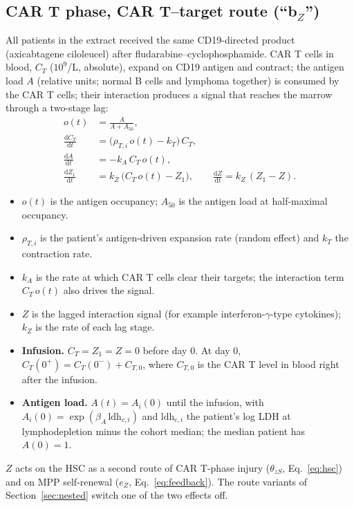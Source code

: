 \documentclass[11pt]{article}
\newcommand{\dd}{\mathrm{d}}
\begin{document}
\subsection{CAR T phase, CAR T--target route \texorpdfstring{(``b$_Z$'')}{(b-Z)}}\label{sec:cart}
All patients in the extract received the same CD19-directed product (axicabtagene ciloleucel) after fludarabine--cyclophosphamide. CAR T cells in blood, $C_T$ ($10^9$/L, absolute), expand on CD19 antigen and contract; the antigen load $A$ (relative units; normal B cells and lymphoma together) is consumed by the CAR T cells; their interaction produces a signal that reaches the marrow through a two-stage lag:
\begin{align}
o(t) &= \frac{A}{A + A_{50}}, \label{eq:occ}\\
\frac{\dd C_T}{\dd t} &= \bigl(\rho_{T,i}\, o(t) - k_T\bigr)\, C_T, \label{eq:cart}\\
\frac{\dd A}{\dd t} &= -k_A\, C_T\, o(t), \label{eq:antigen}\\
\frac{\dd Z_1}{\dd t} &= k_Z\,\bigl(C_T\,o(t) - Z_1\bigr), \qquad \frac{\dd Z}{\dd t} = k_Z\,(Z_1 - Z). \label{eq:zlag}
\end{align}
\begin{itemize}
\item $o(t)$ is the antigen occupancy; $A_{50}$ is the antigen load at half-maximal occupancy.
\item $\rho_{T,i}$ is the patient's antigen-driven expansion rate (random effect) and $k_T$ the contraction rate.
\item $k_A$ is the rate at which CAR T cells clear their targets; the interaction term $C_T\,o(t)$ also drives the signal.
\item $Z$ is the lagged interaction signal (for example interferon-$\gamma$-type cytokines); $k_Z$ is the rate of each lag stage.
\item \textbf{Infusion.} $C_T=Z_1=Z=0$ before day 0. At day 0, $C_T(0^+)=C_T(0^-)+C_{T,0}$, where $C_{T,0}$ is the CAR T level in blood right after the infusion.
\item \textbf{Antigen load.} $A(t)=A_i(0)$ until the infusion, with $A_i(0)=\exp(\beta_A\,\mathrm{ldh}_{c,i})$ and $\mathrm{ldh}_{c,i}$ the patient's log LDH at lymphodepletion minus the cohort median; the median patient has $A(0)=1$.
\end{itemize}
$Z$ acts on the HSC as a second route of CAR T-phase injury ($\theta_{zS}$, Eq.~\ref{eq:hsc}) and on MPP self-renewal ($e_Z$, Eq.~\ref{eq:feedback}). The route variants of Section~\ref{sec:nested} switch one of the two effects off.
\end{document}
